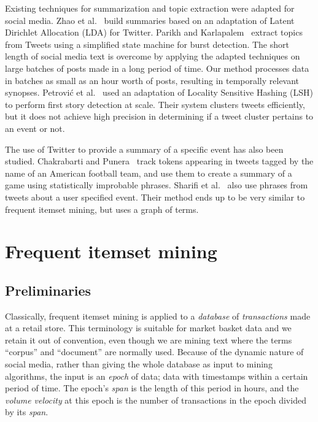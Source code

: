 \documentclass{sig-alternate}
\begin{document}
Existing techniques for summarization and topic extraction were adapted for social media.
Zhao et al.~\cite{Zhao:2011:TKE:2002472.2002521} build summaries based on 
an adaptation of Latent Dirichlet Allocation (LDA) for Twitter.
Parikh and Karlapalem~\cite{parikh2013events} extract topics 
from Tweets using a simplified state machine for burst detection.
The short length of social media text is overcome by 
applying the adapted techniques on large batches of posts made in a long period of time. 
Our method processes data in batches as small as an hour worth of posts, 
resulting in temporally relevant synopses. 
Petrovi\'{c} et al.~\cite{petrovic2010streaming}
used an adaptation of Locality Sensitive Hashing (LSH) %
to perform first story detection at scale.
Their system clusters tweets efficiently,
but it does not achieve high precision in 
determining if a tweet cluster
pertains to an event or not.

The use of Twitter to provide a summary of a specific event 
has also been studied. 
Chakrabarti and Punera~\cite{chakrabarti2011event} track 
tokens appearing in tweets tagged by the name of an American football team,
and use them to create a summary of a game using statistically improbable phrases.
Sharifi et al.~\cite{sharifi2010summarizing} also use phrases from tweets about a user specified event.
Their method ends up to be very similar to frequent itemset mining,
but uses a graph of terms.

\section{Frequent itemset mining}
\label{sec:fim}
\subsection{Preliminaries}
Classically, frequent itemset mining is applied to a \emph{database} of
\emph{transactions} made at a retail store.
This terminology is suitable for market basket data and we retain it out of
convention, even though we are mining text where the terms ``corpus'' and
``document'' are normally used.
Because of the dynamic nature of social media, rather than giving the whole
database as input to mining algorithms, the input is an \emph{epoch} of data;
data with timestamps within a certain period of time.
The epoch's \emph{span} is the length of this period in hours,
and the \emph{volume velocity} at this epoch is the number of transactions in the epoch
divided by its \emph{span}.
\end{document}
